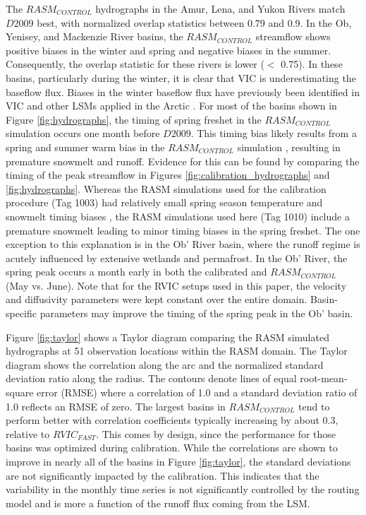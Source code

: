 \documentclass[jgrga, draft]{agutex}
\begin{document}
\begin{article}
The $RASM_{CONTROL}$ hydrographs in the Amur, Lena, and Yukon Rivers match $D2009$ best, with normalized overlap statistics between 0.79 and 0.9.
In the Ob, Yenisey, and Mackenzie River basins, the $RASM_{CONTROL}$ streamflow shows positive biases in the winter and spring and negative biases in the summer.
Consequently, the overlap statistic for these rivers is lower ($<$ 0.75).
In these basins, particularly during the winter, it is clear that VIC is underestimating the baseflow flux.
Biases in the winter baseflow flux have previously been identified in VIC and other LSMs applied in the Arctic \citep{Slater_2007}.
For most of the basins shown in Figure \ref{fig:hydrographs}, the timing of spring freshet in the $RASM_{CONTROL}$ simulation occurs one month before $D2009$.
This timing bias likely results from a spring and summer warm bias in the $RASM_{CONTROL}$ simulation \citep{Hamman_2016,Cassano_2016}, resulting in premature snowmelt and runoff.
Evidence for this can be found by comparing the timing of the peak streamflow in Figures \ref{fig:calibration_hydrographs} and \ref{fig:hydrographs}.
Whereas the RASM simulations used for the calibration procedure (Tag 1003) had relatively small spring season temperature and snowmelt timing biases \citep{Hamman_2016}, the RASM simulations used here (Tag 1010) include a premature snowmelt leading to minor timing biases in the spring freshet.
The one exception to this explanation is in the Ob' River basin, where the runoff regime is acutely influenced by extensive wetlands and permafrost.
In the Ob' River, the spring peak occurs a month early in both the calibrated and $RASM_{CONTROL}$ (May vs. June).
Note that for the RVIC setups used in this paper, the velocity and diffusivity parameters were kept constant over the entire domain.
Basin-specific parameters may improve the timing of the spring peak in the Ob' basin.

Figure \ref{fig:taylor} shows a Taylor diagram comparing the RASM simulated hydrographs at 51 observation locations within the RASM domain.
The Taylor diagram shows the correlation along the arc and the normalized standard deviation ratio along the radius.
The contours denote lines of equal root-mean-square error (RMSE) where a correlation of 1.0 and a standard deviation ratio of 1.0 reflects an RMSE of zero.
The largest basins in $RASM_{CONTROL}$ tend to perform better with correlation coefficients typically increasing by about 0.3, relative to $RVIC_{FAST}$.
This comes by design, since the performance for those basins was optimized during calibration.
While the correlations are shown to improve in nearly all of the basins in Figure \ref{fig:taylor}, the standard deviations are not significantly impacted by the calibration.
This indicates that the variability in the monthly time series is not significantly controlled by the routing model and is more a function of the runoff flux coming from the LSM.


\end{article}
\end{document}
